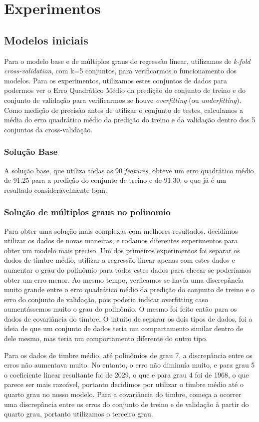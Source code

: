 \documentclass[conference]{IEEEtran}
\begin{document}
\section{Experimentos}
\subsection{Modelos iniciais}
Para o modelo base e de múltiplos graus de regressão linear, utilizamos de \textit{k-fold cross-validation}, com k=5 conjuntos, para verificarmos o funcionamento dos modelos. Para os experimentos, utilizamos estes conjuntos de dados para podermos ver o Erro Quadrático Médio da predição do conjunto de treino e do conjunto de validação para verificarmos se houve \textit{overfitting} (ou \textit{underfitting}). Como medição de precisão antes de utilizar o conjunto de testes, calculamos a média do erro quadrático médio da predição do treino e da validação dentro dos 5 conjuntos da cross-validação.

\subsubsection{Solução Base}
A solução base, que utiliza todas as 90 \textit{features}, obteve um erro quadrático médio de 91.25 para a predição do conjunto de treino e de 91.30, o que já é um resultado consideravelmente bom.

\subsubsection{Solução de múltiplos graus no polinomio}
Para obter uma solução mais complexas com melhores resultados, decidimos utilizar os dados de novas maneiras, e rodamos diferentes experimentos para obter um modelo mais preciso. Um dos primeiros experimentos foi separar os dados de timbre médio, utilizar a regressão linear apenas com estes dados e aumentar o grau do polinômio para todos estes dados para checar se poderíamos obter um erro menor. Ao mesmo tempo, verficamos se havia uma discrepância muito grande entre o erro quadrático médio da predição do conjunto de treino e o erro do conjunto de validação, pois poderia indicar overfitting caso aumentássemos muito o grau do polinômio. O mesmo foi feito então para os dados de covariância do timbre. O intuito de separar os dois tipos de dados, foi a ideia de que um conjunto de dados teria um compartamento similar dentro de dele mesmo, mas teria um comportamento diferente do outro tipo.

Para os dados de timbre médio, até polinômios de grau 7, a discrepância entre os erros não aumentava muito. No entanto, o erro não diminuía muito, e para grau 5 o coeficiente linear resultante foi de 2029, o que e para grau 4 foi de 1968, o que parece ser mais razoável, portanto decidimos por utilizar o timbre médio até o quarto grau no nosso modelo. Para a covariância do timbre, começa a ocorrer uma discrepância entre os erros do conjunto de treino e de validação à partir do quarto grau, portanto utilizamos o terceiro grau.
\end{document}
